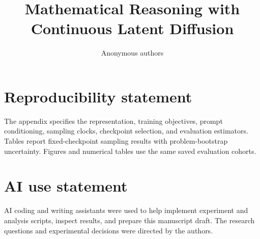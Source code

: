 \documentclass{article}
\title{Mathematical Reasoning with\\ Continuous Latent Diffusion}
\author{Anonymous authors}
\begin{document}
\maketitle








\section*{Reproducibility statement}
The appendix specifies the representation, training objectives, prompt conditioning, sampling clocks, checkpoint selection, and evaluation estimators. Tables report fixed-checkpoint sampling results with problem-bootstrap uncertainty. Figures and numerical tables use the same saved evaluation cohorts.

\section*{AI use statement}
AI coding and writing assistants were used to help implement experiment and analysis scripts, inspect results, and prepare this manuscript draft. The research questions and experimental decisions were directed by the authors.



\clearpage
\appendix

\end{document}
